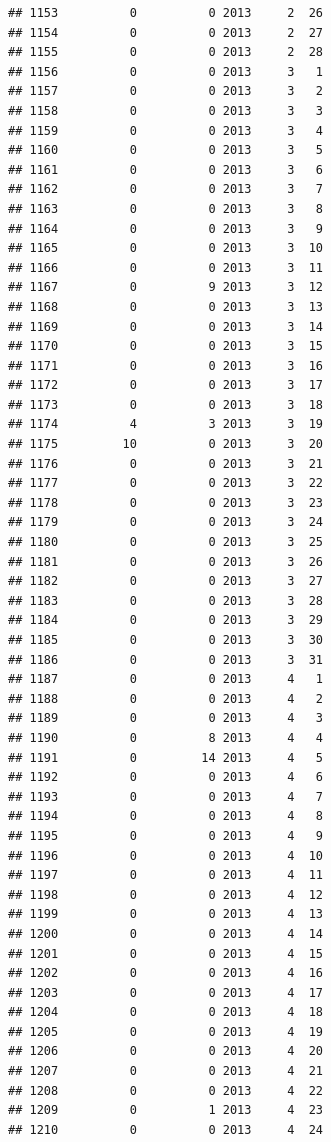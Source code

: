 \documentclass[
]{article}
\begin{document}
\begin{verbatim}
## 1153          0          0 2013     2  26
## 1154          0          0 2013     2  27
## 1155          0          0 2013     2  28
## 1156          0          0 2013     3   1
## 1157          0          0 2013     3   2
## 1158          0          0 2013     3   3
## 1159          0          0 2013     3   4
## 1160          0          0 2013     3   5
## 1161          0          0 2013     3   6
## 1162          0          0 2013     3   7
## 1163          0          0 2013     3   8
## 1164          0          0 2013     3   9
## 1165          0          0 2013     3  10
## 1166          0          0 2013     3  11
## 1167          0          9 2013     3  12
## 1168          0          0 2013     3  13
## 1169          0          0 2013     3  14
## 1170          0          0 2013     3  15
## 1171          0          0 2013     3  16
## 1172          0          0 2013     3  17
## 1173          0          0 2013     3  18
## 1174          4          3 2013     3  19
## 1175         10          0 2013     3  20
## 1176          0          0 2013     3  21
## 1177          0          0 2013     3  22
## 1178          0          0 2013     3  23
## 1179          0          0 2013     3  24
## 1180          0          0 2013     3  25
## 1181          0          0 2013     3  26
## 1182          0          0 2013     3  27
## 1183          0          0 2013     3  28
## 1184          0          0 2013     3  29
## 1185          0          0 2013     3  30
## 1186          0          0 2013     3  31
## 1187          0          0 2013     4   1
## 1188          0          0 2013     4   2
## 1189          0          0 2013     4   3
## 1190          0          8 2013     4   4
## 1191          0         14 2013     4   5
## 1192          0          0 2013     4   6
## 1193          0          0 2013     4   7
## 1194          0          0 2013     4   8
## 1195          0          0 2013     4   9
## 1196          0          0 2013     4  10
## 1197          0          0 2013     4  11
## 1198          0          0 2013     4  12
## 1199          0          0 2013     4  13
## 1200          0          0 2013     4  14
## 1201          0          0 2013     4  15
## 1202          0          0 2013     4  16
## 1203          0          0 2013     4  17
## 1204          0          0 2013     4  18
## 1205          0          0 2013     4  19
## 1206          0          0 2013     4  20
## 1207          0          0 2013     4  21
## 1208          0          0 2013     4  22
## 1209          0          1 2013     4  23
## 1210          0          0 2013     4  24

\end{verbatim}
\end{document}
